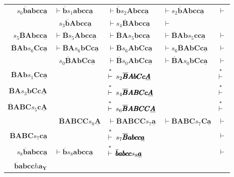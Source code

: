 \begin{center}\begin{tabular}{r@{ }l@{ }l@{ }l@{ }l}
$s_0\overline{\pmb{b}}\pmb{abcc}\underline{\pmb{a}}$ & $\vdash\overline{\pmb{b}}s_1\pmb{abcc}
	\underline{\pmb{a}}$ & $\vdash\overline{\pmb{b}}s_2\pmb{Abcc}\underline{
	\pmb{a}}$ & $\vdash s_2\overline{\pmb{b}}\pmb{Abcc}\underline{\pmb{a}}$ & $\vdash$ \\
& $\ \ \ s_3\overline{\pmb{b}}\pmb{Abcc}\underline{\pmb{a}}$ & $\vdash s_4\overline{\pmb{B}}\pmb{Abcc}\underline{\pmb{a}}$ &
	$\vdash$ \\
$s_5\overline{\pmb{B}}\pmb{Abcc}\underline{\pmb{a}}$ & $\vdash\overline{\pmb{B}}s_5\pmb{Abcc}
	\underline{\pmb{a}}$ & $\vdash\overline{\pmb{B}}\pmb{A}s_5\pmb{bcc}\underline{\pmb{a}}$ &
	$\vdash\overline{\pmb{B}}\pmb{Ab}s_5\pmb{cc}\underline{\pmb{a}}$ & $\vdash$ \\
$\overline{\pmb{B}}\pmb{Ab}s_6\pmb{Cc}\underline{\pmb{a}}$ & $\vdash\overline{\pmb{B}}\pmb{A}s_6\pmb{bCc}
	\underline{\pmb{a}}$ & $\vdash\overline{\pmb{B}}s_6\pmb{AbCc}\underline{\pmb{a}}$ &
	$\vdash s_6\overline{\pmb{B}}\pmb{AbCc}\underline{\pmb{a}}$ & $\vdash$ \\
& $\ \ \ s_0\overline{\pmb{B}}\pmb{AbCc}\underline{\pmb{a}}$ & $\vdash\overline{\pmb{B}}s_0\pmb{Ab
	Cc}\underline{\pmb{a}}$ & $\vdash\overline{\pmb{B}}\pmb{A}s_0\pmb{bCc}\underline{\pmb{a}}$
	& $\vdash$ \\
$\overline{\pmb{B}}\pmb{Ab}s_1\pmb{Cc}\underline{\pmb{a}}$ && $\Dvdash s_2\overline{\pmb{B}}
	\pmb{AbCc}\underline{\pmb{A}}$ && $\Dvdash$ \\
$\overline{\pmb{B}}\pmb{A}s_3\pmb{bCc}\underline{\pmb{A}}$ && $\Dvdash s_4\overline{\pmb{B}}
	\pmb{ABCc}\underline{\pmb{A}}$ && $\Dvdash$ \\
$\overline{\pmb{B}}\pmb{ABC}s_5\pmb{c}\underline{\pmb{A}}$ && $\Dvdash s_6\overline{\pmb{B}}
	\pmb{ABCC}\underline{\pmb{A}}$ && $\Dvdash$ \\
& $\ \ \ \overline{\pmb{B}}\pmb{ABCC}s_0\underline{\pmb{A}}$ & $\vdash\overline{\pmb{B}}\pmb{ABCC}
	s_7\underline{\pmb{a}}$ & $\vdash\overline{\pmb{B}}\pmb{ABC}s_7\pmb{C}
	\underline{\pmb{a}}$ & $\vdash$ \\
$\overline{\pmb{B}}\pmb{ABC}s_7\pmb{c}\underline{\pmb{a}}$ && $\Dvdash s_7\overline{\pmb{B}}
	\pmb{abcc}\underline{\pmb{a}}$ && $\vdash$ \\
$s_8\overline{\pmb{b}}\pmb{abcc}\underline{\pmb{a}}$ & $\vdash\overline{\pmb{b}}s_8\pmb{abcc}
	\underline{\pmb{a}}$ & $\Dvdash\overline{\pmb{b}}\pmb{abcc}s_8\underline{\pmb{a}}$
	&& $\vdash$ \\
$\overline{\pmb{b}}\pmb{abcc}h\pmb{a_{Y}}$
\end{tabular}\end{center}

